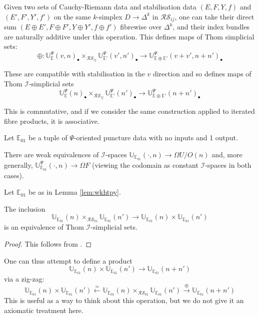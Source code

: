 \documentclass{TPmod}
\def\bE{\mathbb{E}}
\def\bU{\mathbb{U}}
\newcommand{\cI}{\mathcal{I}}
\newcommand{\cR}{\mathcal{R}}
\newcommand{\cS}{\mathcal{S}}
\numberwithin{equation}{section}
\begin{document}
        Given two sets of Cauchy-Riemann data and stabilisation data $(E,F,Y,f)$ and $(E',F',Y',f')$ on the same $k$-simplex $D \to \Delta^k$ in $\cR\cS_{ij}$, one can take their direct sum $(E\oplus E', F \oplus F', Y \oplus Y', f \oplus f')$ fibrewise over $\Delta^k$, and their index bundles are naturally additive under this operation. This defines maps of Thom simplicial sets: 
        \[
        \oplus: \bU^\Psi_{\bE}(v,n)_\bullet \times_{\cR\cS_{ij}} \bU^\Psi_{\bE'}(v',n')_\bullet \to \bU^\Psi_{\bE \oplus \bE'}(v+v',n+n')_\bullet
        \]
        
        These are compatible with stabilisation in the $v$ direction and so defines maps of Thom $\cI$-simplicial sets 
        \[
        \bU_{\bE}^\Psi(n)_\bullet \times_{\cR\cS_{ij}} \bU^\Psi_{\bE'}(n')_\bullet \to \bU^\Psi_{\bE\oplus\bE'}(n + n')_\bullet
        \]
        
        This is commutative, and if we consider the same construction applied to iterated fibre products, it is associative.

\begin{lem}[{\cite[Lemma 3.31]{PS2}}]\label{lem:wkhtpy}
    Let $\bE_{01}$ be a tuple of $\Psi$-oriented puncture data with no inputs and 1 output.

    There are weak equivalences of $\cI$-spaces $\bU_{\bE_{01}}(\cdot, n) \to \Omega U/O (n)$ and, more generally, $\bU^\Psi_{\bE_{01}}(\cdot, n) \to \Omega F$ (viewing the codomain as constant $\cI$-spaces in both cases).
\end{lem}

\begin{lem}
    Let $\bE_{01}$ be as in Lemma \ref{lem:wkhtpy}.

    The inclusion 
\[
\bU_{\bE_{01}}(n) \times_{\cR\cS_{01}} \bU_{\bE_{01}}(n') \to \bU_{\bE_{01}}(n) \times \bU_{\bE_{01}}(n')
\]
is an equivalence of Thom $\cI$-simplicial sets.
\end{lem}

\begin{proof}
    This follows from \cite[Lemma 3.31]{PS2}.
\end{proof}
    \begin{rmk}
       One can thus attempt to define a product 
       \[
       \bU_{\bE_{01}}(n) \times \bU_{\bE_{01}}(n') \to \bU_{\bE_{01}}(n+n')
       \]
       via a zig-zag:
        \begin{equation}\label{eq: zdfgegwsed}
            \bU_{\bE_{01}}(n) \times \bU_{\bE_{01}}(n') \xleftarrow{\simeq} \bU_{\bE_{01}}(n) \times_{\cR\cS_{01}} \bU_{\bE_{01}}(n') \xrightarrow{\oplus} \bU_{\bE_{01}}(n+n')
        \end{equation}
        This is useful as a way to think about this operation, but we do not give it an axiomatic treatment here.
    \end{rmk}
\end{document}
